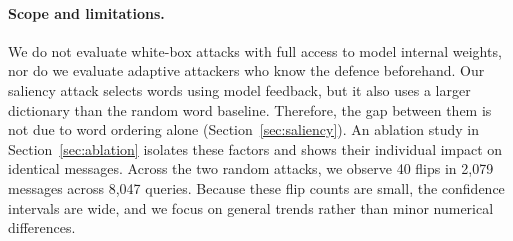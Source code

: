 \paragraph{Scope and limitations.} We do not evaluate white-box attacks with
full access to model internal weights, nor do we evaluate adaptive attackers who
know the defence beforehand. Our saliency attack selects words using model
feedback, but it also uses a larger dictionary than the random word baseline.
Therefore, the gap between them is not due to word ordering alone
(Section~\ref{sec:saliency}). An ablation study in Section~\ref{sec:ablation} isolates these
factors and shows their individual impact on identical messages. Across the two
random attacks, we observe 40 flips in 2{,}079 messages across 8{,}047 queries.
Because these flip counts are small, the confidence intervals are wide, and we
focus on general trends rather than minor numerical differences.
